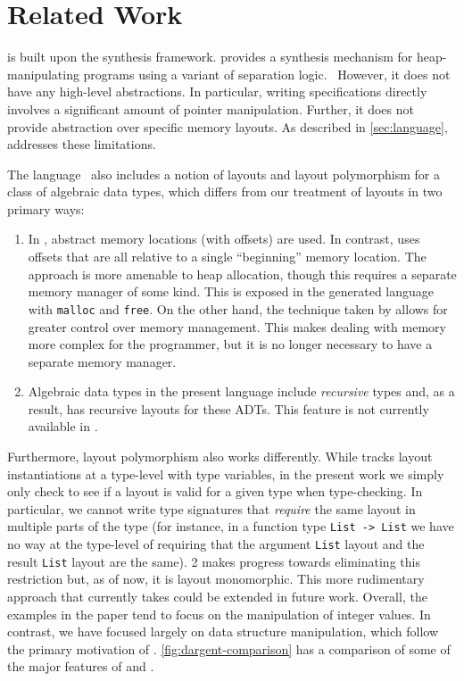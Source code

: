 \section{Related Work}
\label{sec:related-work}

\tool is built upon the \suslik synthesis framework. \suslik provides
a synthesis mechanism for heap-manipulating programs using a variant
of separation logic.~\cite{polikarpova:2019:suslik} However, it does
not have any high-level abstractions. In particular, writing \suslik
specifications directly involves a significant amount of pointer
manipulation. Further, it does not provide abstraction over specific
memory layouts. As described in \autoref{sec:language}, \tool
addresses these limitations.

The  language~\cite{chen:2023:dargent} also includes a
notion of layouts and layout polymorphism for a class of algebraic
data types, which differs from our treatment of layouts in two primary
ways:

\begin{enumerate}

\item In \tool, abstract memory locations (with offsets) are used. In
  contrast,  uses offsets that are all
  relative to a single ``beginning'' memory location. The \tool
  approach is more amenable to heap allocation, though
  this requires a separate memory manager of some kind. This is
  exposed in the generated language with \verb|malloc| and
  \verb|free|.
  On the other hand, the technique taken by  allows
  for greater control over memory management. This makes
  dealing with memory more complex for the programmer, but it is no
  longer necessary to have a separate memory manager.

  \item Algebraic data types in the present language include
    \emph{recursive} types and,
    as a result, \tool has recursive layouts for these ADTs. This
    feature is not currently available in .
  \end{enumerate}

Furthermore, layout polymorphism also works differently. While
 tracks layout instantiations at a type-level with type
variables, in the present work we simply only check to see if a layout
is valid for a given type when type-checking. In particular, we cannot
write type signatures that \textit{require} the same layout in
multiple parts of the type (for instance, in a function type
\lstinline[language=Pika]{List -> List} we have no way at the type-level of requiring that
the argument \verb|List| layout and the result \verb|List| layout are
the same). \Pika{} 2 makes progress towards eliminating this restriction but, as of now, it is layout monomorphic. This more rudimentary approach that \tool currently takes
could be extended in future work.
%
Overall, the examples in the  paper tend to focus on
the manipulation of integer values. In contrast, we have focused
largely on data structure manipulation, which follow the primary
motivation of \suslik. \autoref{fig:dargent-comparison} has a comparison of some of the major features of \Pika{} and .

